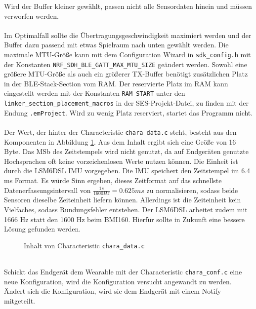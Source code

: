 Wird der Buffer kleiner gewählt, passen nicht alle Sensordaten hinein und müssen verworfen werden.\\\\
Im Optimalfall sollte die Übertragungsgeschwindigkeit maximiert werden und der Buffer dazu passend mit etwas Spielraum nach unten gewählt werden.
Die maximale MTU-Größe kann mit dem Configuration Wizard in \texttt{sdk\_config.h} mit der Konstanten \texttt{NRF\_SDH\_BLE\_GATT\_MAX\_MTU\_SIZE} geändert werden.
Sowohl eine größere MTU-Größe als auch ein größerer TX-Buffer benötigt zusätzlichen Platz in der BLE-Stack-Section vom RAM.
Der reservierte Platz im RAM kann eingestellt werden mit der Konstanten \texttt{RAM\_START} unter den \texttt{linker\_section\_placement\_macros} in der SES-Projekt-Datei, zu finden mit der Endung \texttt{.emProject}.
Wird zu wenig Platz reserviert, startet das Programm nicht.\\\\
Der Wert, der hinter der Characteristic \texttt{chara\_data.c} steht, besteht aus den Komponenten in Abbildung \ref{lst:imuData}.
Aus dem Inhalt ergibt sich eine Größe von 16 Byte.
Das MSb des Zeitstempels wird nicht genutzt, da auf Endgeräten genutzte Hochsprachen oft keine vorzeichenlosen Werte nutzen können.
Die Einheit ist durch die LSM6DSL IMU vorgegeben.
Die IMU speichert den Zeitstempel im 6.4 ms Format.
Es würde Sinn ergeben, dieses Zeitformat auf das schnellste Datenerfassungsintervall von $\frac{1s}{1600Hz} = 0.625 ms$ zu normalisieren, sodass beide Sensoren dieselbe Zeiteinheit liefern können.
Allerdings ist die Zeiteinheit kein Vielfaches, sodass Rundungsfehler entstehen.
Der LSM6DSL arbeitet zudem mit 1666 Hz statt den 1600 Hz beim BMI160.
Hierfür sollte in Zukunft eine bessere Lösung gefunden werden.
\begin{figure}[hbtp]
	
	\caption{Inhalt von Characteristic \texttt{chara\_data.c}}
	\label{lst:imuData}
\end{figure}\\
Schickt das Endgerät dem Wearable mit der Characteristic \texttt{chara\_conf.c} eine neue Konfiguration, wird die Konfiguration versucht angewandt zu werden.
Ändert sich die Konfiguration, wird sie dem Endgerät mit einem Notify mitgeteilt.

